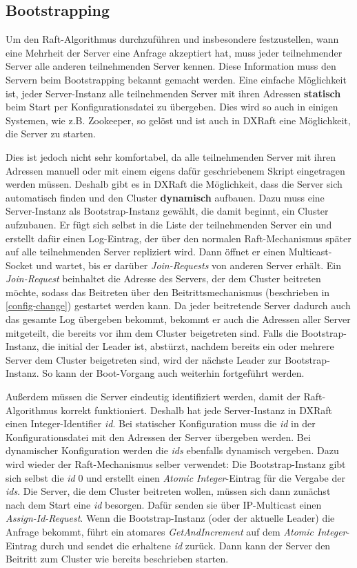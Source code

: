 \subsection{Bootstrapping}

Um den Raft-Algorithmus durchzuführen und insbesondere festzustellen, wann eine Mehrheit der Server eine Anfrage akzeptiert hat, muss jeder teilnehmender Server alle anderen teilnehmenden Server kennen. Diese Information muss den Servern beim Bootstrapping bekannt gemacht werden. Eine einfache Möglichkeit ist, jeder Server-Instanz alle teilnehmenden Server mit ihren Adressen \textbf{statisch} beim Start per Konfigurationsdatei zu übergeben. Dies wird so auch in einigen Systemen, wie z.B. Zookeeper, so gelöst und ist auch in DXRaft eine Möglichkeit, die Server zu starten. 

Dies ist jedoch nicht sehr komfortabel, da alle teilnehmenden Server mit ihren Adressen manuell oder mit einem eigens dafür geschriebenem Skript eingetragen werden müssen. Deshalb gibt es in DXRaft die Möglichkeit, dass die Server sich automatisch finden und den Cluster \textbf{dynamisch} aufbauen. Dazu muss eine Server-Instanz als Bootstrap-Instanz gewählt, die damit beginnt, ein Cluster aufzubauen. Er fügt sich selbst in die Liste der teilnehmenden Server ein und erstellt dafür einen Log-Eintrag, der über den normalen Raft-Mechanismus später auf alle teilnehmenden Server repliziert wird. Dann öffnet er einen Multicast-Socket und wartet, bis er darüber \textit{Join-Requests} von anderen Server erhält. Ein \textit{Join-Request} beinhaltet die Adresse des Servers, der dem Cluster beitreten möchte, sodass das Beitreten über den Beitrittsmechanismus (beschrieben in \ref{config-change}) gestartet werden kann. Da jeder beitretende Server dadurch auch das gesamte Log übergeben bekommt, bekommt er auch die Adressen aller Server mitgeteilt, die bereits vor ihm dem Cluster beigetreten sind. Falls die Bootstrap-Instanz, die initial der Leader ist, abstürzt, nachdem bereits ein oder mehrere Server dem Cluster beigetreten sind, wird der nächste Leader zur Bootstrap-Instanz. So kann der Boot-Vorgang auch weiterhin fortgeführt werden.

Außerdem müssen die Server eindeutig identifiziert werden, damit der Raft-Algorithmus korrekt funktioniert. Deshalb hat jede Server-Instanz in DXRaft einen Integer-Identifier \textit{id}. Bei statischer Konfiguration muss die \textit{id} in der Konfigurationsdatei mit den Adressen der Server übergeben werden. Bei dynamischer Konfiguration werden die \textit{ids} ebenfalls dynamisch vergeben. Dazu wird wieder der Raft-Mechanismus selber verwendet: Die Bootstrap-Instanz gibt sich selbst die \textit{id} 0 und erstellt einen \textit{Atomic Integer}-Eintrag für die Vergabe der \textit{ids}. Die Server, die dem Cluster beitreten wollen, müssen sich dann zunächst nach dem Start eine \textit{id} besorgen. Dafür senden sie über IP-Multicast einen \textit{Assign-Id-Request}. Wenn die Bootstrap-Instanz (oder der aktuelle Leader) die Anfrage bekommt, führt ein atomares \textit{GetAndIncrement} auf dem \textit{Atomic Integer}-Eintrag durch und sendet die erhaltene \textit{id} zurück. Dann kann der Server den Beitritt zum Cluster wie bereits beschrieben starten.

